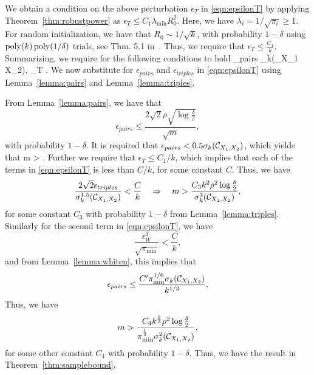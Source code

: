 We obtain a condition on the above perturbation $\epsilon_T$ in \eqref{eqn:epsilonT} by applying Theorem~\ref{thm:robustpower} as
$ \epsilon_T\leq C_1\lambda_{\min} R_0^2$. Here, we have $\lambda_{i} = 1/\sqrt{\pi_{i}}\geq 1$. For random initialization, we have that $R_0 \sim 1/\sqrt{k}$, with probability $1-\delta$ using $\operatorname{poly}(k) \operatorname{poly}(1/\delta)$ trials, see Thm. 5.1 in~\cite{AnandkumarEtal:tensor12}. Thus, we require that $ \epsilon_T  \leq \frac{C_1}{k}$. Summarizing, we require for the following conditions to hold
\beq\epsilon_{pairs} \sigma_k(\Ccal_{X_1 X_2}), \quad \epsilon_T  \leq {}.\eeq
We now substitute for $\epsilon_{pairs}$ and $\epsilon_{triples}$ in \eqref{eqn:epsilonT} using Lemma~\ref{lemma:pairs} and Lemma~\ref{lemma:triples}. 



From Lemma~\ref{lemma:pairs}, we have that 
\[ \epsilon_{pairs}  \leqslant \frac{2\sqrt{2}\rho \sqrt{\log\frac{\delta}{2}}}{\sqrt{m}}, \]with probability $1-\delta$. It is required that $\epsilon_{pairs} < 0.5 \sigma_k(\mathcal{C}_{X_1, X_2})$, which yields that \beq\label{eqn:cond1} m > .\eeq
Further we require that $\epsilon_T \leq C_1/k$, which implies that each of the terms in \eqref{eqn:epsilonT} is less than $C/k$, for some constant $C$. Thus, we have
\[ \frac{2\sqrt{2} \epsilon_{triples}}{\sigma_k^{1.5}(\Ccal_{X_1, X_2})} < \frac{C}{k}\quad\Rightarrow\quad m > \frac{C_3 k^2 \rho^2 \log \frac{\delta}{2}}{\sigma_k^{3}(\Ccal_{X_1, X_2})},\]
for some constant $C_3$ with probability $1-\delta$ from Lemma~\ref{lemma:triples}. Similarly for the second term in \eqref{eqn:epsilonT}, we have
\[\frac{\epsilon_W^3}{\sqrt{\pi_{\min}}}< \frac{C}{k},\]and from Lemma~\ref{lemma:whiten}, this implies that \[ \epsilon_{pairs} \leq \frac{C' \pi_{\min}^{1/6} \sigma_k(\Ccal_{X_1, X_2})}{k^{1/3}\iffalse(1+\sigma_{k+1}(\Ccal_{X_1, X_2}))\fi},\]Thus, we have
\[  m > \frac{C_4 k^{\frac{2}{3}} \rho^2 \log\frac{\delta}{2}\iffalse (1+\sigma_{k+1}(\Ccal_{X_1, X_2}))^2\fi}{\pi_{\min}^{\frac{1}{3}} \sigma^2_k(\Ccal_{X_1, X_2})}, \]for some other constant $C_4$ with probability $1-\delta$. \iffalse Additionally, we also require
\[ (1+\sigma_{k+1}(\Ccal_{X_1, X_2}))\sigma_{k+1}(\Ccal_{X_1, X_2})\leq \frac{C_5 \pi_{\min}^{1/6} \sigma_k(\Ccal_{X_1, X_2})}{k^{1/3}}.\]\fi
 Thus, we have the result in Theorem~\ref{thm:samplebound}.
 

